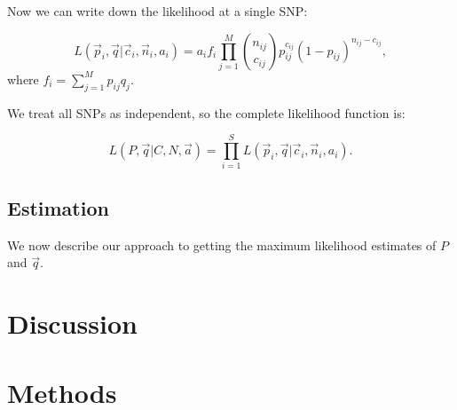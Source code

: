 \documentclass[11pt,titlepage]{article}
\begin{document}
Now we can write down the likelihood at a single SNP:

\begin{equation}
L(\vec p_i, \vec q | \vec c_i, \vec n_i, a_i) = a_i f_i \prod  \limits_{j = 1}^M {n_{ij} \choose c_{ij}} p_{ij}^{c_{ij}} (1-p_{ij})^{n_{ij}- c_{ij}} , 
\end{equation}
\noindent where $f_i = \sum \limits_{j = 1}^{M} p_{ij} q_j$.  

We treat all SNPs as independent, so the complete likelihood function is:

\begin{equation}
L(P, \vec q | C,  N, \vec a) = \prod \limits_{i = 1}^{S} L(\vec p_i, \vec q | \vec c_i, \vec n_i, a_i).
\end{equation}

\subsection{Estimation}
We now describe our approach to getting the maximum likelihood estimates of $P$ and $\vec q$. 

\section{Discussion}

\section{Methods}

\end{document}
